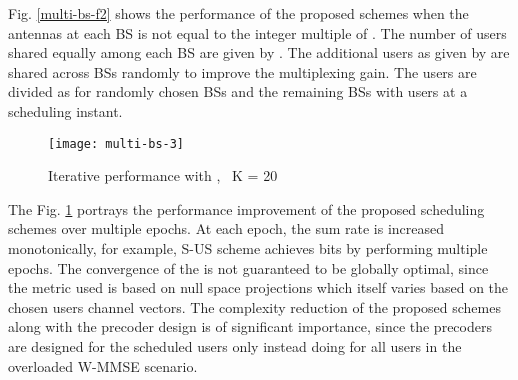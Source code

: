 Fig. \ref{multi-bs-f2} shows the performance of the proposed schemes when the antennas  at each \ac{BS} is not equal to the integer multiple of . The number of users shared equally among each \ac{BS} are given by . The additional users as given by  are shared across \ac{BS}s randomly to improve the multiplexing gain. The users are divided as  for randomly chosen  \ac{BS}s and the remaining \ac{BS}s with  users at a scheduling instant.

\begin{figure}
\centering
\texttt{[image: multi-bs-3]}
\caption[short]{Iterative performance with , \, K = 20}
\label{multi-bs-f3}
\vskip -0.2in
\end{figure}
The Fig. \ref{multi-bs-f3} portrays the performance improvement of the proposed scheduling schemes over multiple epochs. At each epoch, the sum rate is increased monotonically, for example, \ac{S-US} scheme achieves  bits by performing multiple epochs. The convergence of the  is not guaranteed to be globally optimal, since the metric used is based on null space projections which itself varies based on the chosen users channel vectors. The complexity reduction of the proposed schemes along with the precoder design is of significant importance, since the precoders are designed for the scheduled users only instead doing for all users in the overloaded \ac{W-MMSE} scenario.


